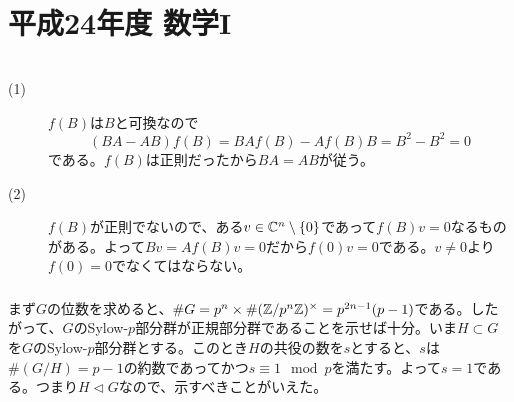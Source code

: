 \section{平成24年度 数学I}



\subsubsection{}%
\begin{sol} ${}$
\begin{description}
  \item[(1)] $f(B)$は$B$と可換なので
  \[
  (BA - AB)f(B) = B Af(B) - A f(B) B = B^2 - B^2 = 0
  \]
  である。$f(B)$は正則だったから$BA=AB$が従う。
  \item[(2)] $f(B)$が正則でないので、ある$v \in {\mathbb C}^n \setminus \{ 0 \}$であって$f(B)v=0$なるものがある。よって$Bv = Af(B) v = 0$だから$f(0)v= 0$である。$v \neq 0$より$f(0)=0$でなくてはならない。
\end{description}
\end{sol}



\newpage



\subsubsection{}%
\begin{sol}
まず$G$の位数を求めると、$\# G = p^n \times \#(\mathbb{Z} / p^n \mathbb{Z})^{\times}  = p^{2n-1}(p-1)$である。したがって、$G$のSylow-$p$部分群が正規部分群であることを示せば十分。いま$H \subset G$を$G$のSylow-$p$部分群とする。このとき$H$の共役の数を$s$とすると、$s$は$\# (G/H) = p-1$の約数であってかつ$s \equiv 1 \mod p$を満たす。よって$s = 1$である。つまり$H \lhd G$なので、示すべきことがいえた。
\end{sol}


